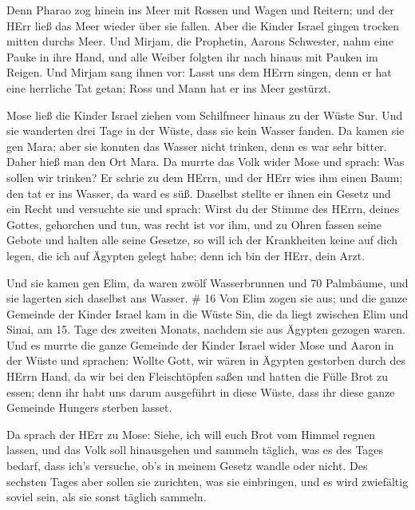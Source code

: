  Denn Pharao zog hinein ins Meer mit Rossen und Wagen und
Reitern; und der HErr ließ das Meer wieder über sie fallen. Aber die
Kinder Israel gingen trocken mitten durchs Meer.  Und
Mirjam, die Prophetin, Aarons Schwester, nahm eine Pauke in ihre Hand,
und alle Weiber folgten ihr nach hinaus mit Pauken im Reigen.
 Und Mirjam sang ihnen vor: Lasst uns dem HErrn singen,
denn er hat eine herrliche Tat getan; Ross und Mann hat er ins Meer
gestürzt.

 Mose ließ die Kinder Israel ziehen vom Schilfmeer hinaus
zu der Wüste Sur. Und sie wanderten drei Tage in der Wüste, dass sie
kein Wasser fanden.  Da kamen sie gen Mara; aber sie
konnten das Wasser nicht trinken, denn es war sehr bitter. Daher hieß
man den Ort Mara.  Da murrte das Volk wider Mose und
sprach: Was sollen wir trinken?  Er schrie zu dem HErrn,
und der HErr wies ihm einen Baum; den tat er ins Wasser, da ward es süß.
Daselbst stellte er ihnen ein Gesetz und ein Recht und versuchte sie
 und sprach: Wirst du der Stimme des HErrn, deines Gottes,
gehorchen und tun, was recht ist vor ihm, und zu Ohren fassen seine
Gebote und halten alle seine Gesetze, so will ich der Krankheiten keine
auf dich legen, die ich auf Ägypten gelegt habe; denn ich bin der HErr,
dein Arzt.

 Und sie kamen gen Elim, da waren zwölf Wasserbrunnen und
70 Palmbäume, und sie lagerten sich daselbst ans Wasser. \# 16
 Von Elim zogen sie aus; und die ganze Gemeinde der Kinder
Israel kam in die Wüste Sin, die da liegt zwischen Elim und Sinai, am
15. Tage des zweiten Monats, nachdem sie aus Ägypten gezogen waren.
 Und es murrte die ganze Gemeinde der Kinder Israel wider
Mose und Aaron in der Wüste  und sprachen: Wollte Gott, wir
wären in Ägypten gestorben durch des HErrn Hand, da wir bei den
Fleischtöpfen saßen und hatten die Fülle Brot zu essen; denn ihr habt
uns darum ausgeführt in diese Wüste, dass ihr diese ganze Gemeinde
Hungers sterben lasset.

 Da sprach der HErr zu Mose: Siehe, ich will euch Brot vom
Himmel regnen lassen, und das Volk soll hinausgehen und sammeln täglich,
was es des Tages bedarf, dass ich's versuche, ob's in meinem Gesetz
wandle oder nicht.  Des sechsten Tages aber sollen sie
zurichten, was sie einbringen, und es wird zwiefältig soviel sein, als
sie sonst täglich sammeln.

